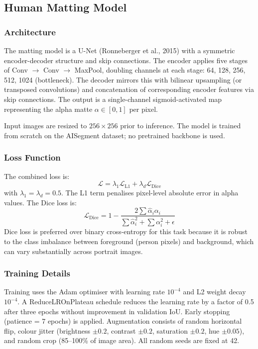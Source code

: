 \documentclass[11pt,a4paper]{article}
\begin{document}
\subsection{Human Matting Model}

\subsubsection{Architecture}

The matting model is a U-Net (Ronneberger et al., 2015) with a symmetric
encoder-decoder structure and skip connections. The encoder applies five stages of
Conv $\to$ Conv $\to$ MaxPool, doubling channels at each stage: 64, 128, 256, 512,
1024 (bottleneck). The decoder mirrors this with bilinear upsampling (or transposed
convolutions) and concatenation of corresponding encoder features via skip connections.
The output is a single-channel sigmoid-activated map representing the alpha matte
$\alpha \in [0, 1]$ per pixel.

Input images are resized to $256 \times 256$ prior to inference. The model is trained
from scratch on the AISegment dataset; no pretrained backbone is used.

\subsubsection{Loss Function}

The combined loss is:
\begin{equation}
  \mathcal{L} = \lambda_1 \mathcal{L}_{\text{L1}} + \lambda_d \mathcal{L}_{\text{Dice}}
\end{equation}
with $\lambda_1 = \lambda_d = 0.5$. The L1 term penalises pixel-level absolute error
in alpha values. The Dice loss is:
\begin{equation}
  \mathcal{L}_{\text{Dice}} = 1 - \frac{2\sum \hat{\alpha}_i \alpha_i}{\sum \hat{\alpha}_i^2 + \sum \alpha_i^2 + \epsilon}
\end{equation}
Dice loss is preferred over binary cross-entropy for this task because it is robust to
the class imbalance between foreground (person pixels) and background, which can vary
substantially across portrait images.

\subsubsection{Training Details}

Training uses the Adam optimiser with learning rate $10^{-4}$ and L2 weight decay
$10^{-4}$. A ReduceLROnPlateau schedule reduces the learning rate by a factor of 0.5
after three epochs without improvement in validation IoU. Early stopping (patience = 7
epochs) is applied. Augmentation consists of random horizontal flip, colour jitter
(brightness $\pm0.2$, contrast $\pm0.2$, saturation $\pm0.2$, hue $\pm0.05$), and
random crop (85--100\% of image area). All random seeds are fixed at 42.
\end{document}
